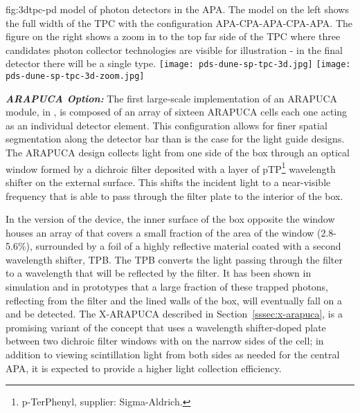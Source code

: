 \begin{dunefigure}{fig:3dtpc-pd}
{\threed model of photon detectors in the APA. The model on the left shows the full width of the TPC with the configuration APA-CPA-APA-CPA-APA. The figure on the right shows a zoom in to the top far side of the TPC where three candidates photon collector technologies are visible for illustration - in the final detector there will be a single type.}
\texttt{[image: pds-dune-sp-tpc-3d.jpg]}
\texttt{[image: pds-dune-sp-tpc-3d-zoom.jpg]}
\end{dunefigure}


\textit{\bf ARAPUCA Option:} The first large-scale implementation of an ARAPUCA module, in , is composed of an array of sixteen ARAPUCA cells each one acting as an individual detector element. This configuration allows for finer spatial segmentation along the detector bar than is the case for the light guide designs. 
The  ARAPUCA design collects light from one side of the box through an optical window formed  
by a dichroic filter deposited with a layer of pTP\footnote{p-TerPhenyl,  supplier: Sigma-Aldrich\textregistered.}
wavelength shifter on the external surface. This shifts the incident  light to a near-visible frequency that is able to pass through the filter plate to the interior of the box.  

In the  version of the device, the inner surface of the box opposite the window houses an array of  that covers a small fraction of the area of the window (2.8-5.6\%), surrounded by a foil of a highly reflective material coated with a second wavelength shifter, TPB. The TPB
converts the light passing through the filter to a wavelength that will be reflected by the filter. It has been shown in simulation and in prototypes that a large fraction of these trapped photons, reflecting from the filter and the lined walls of the box, will eventually fall on a  and be detected.
The X-ARAPUCA described in Section~\ref{sssec:x-arapuca}, is a promising variant of the concept that uses a wavelength shifter-doped plate between two dichroic filter windows with  on the narrow sides of the cell; in addition to viewing scintillation light from both sides as needed for the central APA, it is expected to provide a higher light collection efficiency.

